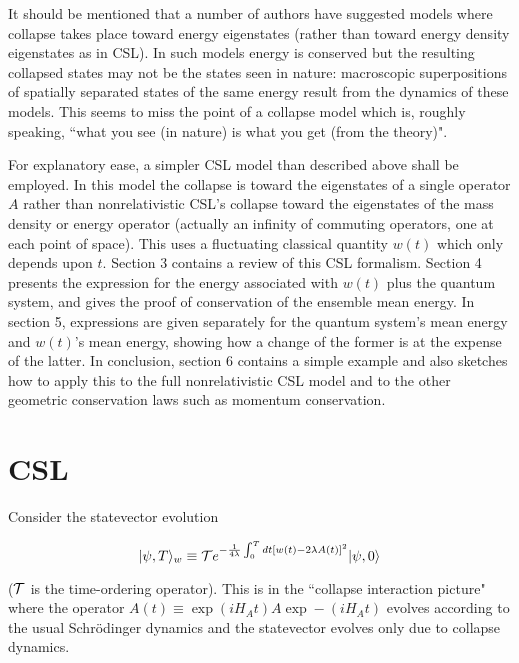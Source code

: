 \documentclass{article}
\begin{document}
  It should be mentioned that a number of authors have suggested models 
where collapse takes place toward energy eigenstates (rather than toward energy 
density eigenstates as in CSL)\cite{SouthAfricans, Percival, Hughston}. In such models  
energy is conserved but the resulting collapsed states 
may not be the states seen in nature: macroscopic superpositions of 
spatially separated states of the same energy result from the dynamics of these models.  This 
seems to miss the point of a collapse model which is, roughly speaking, 
``what you see (in nature) is what you get (from the theory)".   

	For explanatory ease,  
a simpler CSL model than 
described above shall be employed.  In this model 
the collapse is toward the eigenstates 
of a single operator $A$ rather than nonrelativistic CSL's 
collapse toward the eigenstates of 
the mass density or energy operator (actually an infinity of commuting operators, 
one at each point of space). This uses a fluctuating classical quantity $w(t)$ which 
only depends upon $t$.  Section 3 contains a review of this CSL formalism.  
Section 4 presents the expression for the energy associated with $w(t)$ 
plus the quantum system, 
and gives the proof of conservation of the ensemble mean energy.  
In section 5, expressions are given separately for 
the quantum system's mean energy and $w(t)$'s mean 
energy, showing how a change of the former is at the expense of the latter. In conclusion, 
section 6 contains a simple example and 
also sketches how to apply this to the full 
nonrelativistic CSL model and to the other geometric conservation laws such as 
momentum conservation.
 

\section{CSL}\label{CSL}

\hspace{\parindent}Consider the statevector evolution  
	
\begin{equation}\label{3}
	|\psi,T\rangle_{w}\equiv{\cal T}e^{-\frac{1}{4\lambda}\int_{0}^{T}
 dt[w(t)-2\lambda A(t)]^{2}}|\psi,0\rangle
\end{equation}

\noindent(${\cal T}$ is the time-ordering operator).  This is in the 
``collapse interaction picture" where the operator  
$A(t)\equiv \exp(iH_{A}t)A\exp-(iH_{A}t)$ evolves according to the usual Schr\"odinger 
dynamics and the statevector evolves only due to collapse dynamics. 
\end{document}
